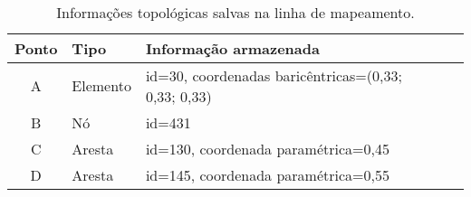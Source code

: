 
\begin{table} [hbt!]
 \begin{center}
	 \caption{Informações topológicas salvas na linha de mapeamento.\label{tab-lm-topo}}
	~\\[-2mm]
	 \begin{tabularx}
		 {\textwidth}
		 {cp{2.0cm} lp{3.0cm} lp{10.0cm}}

		 \textbf{Ponto}
		 & \textbf{Tipo}
		 & \textbf{Informação armazenada} \\ \toprule

		 A
		 & Elemento
		 & id=30, coordenadas baricêntricas=(0,33; 0,33; 0,33) \\ \midrule

		 B
		 & Nó   
		 & id=431 \\ \midrule

		 C
		 & Aresta
		 & id=130, coordenada paramétrica=0,45 \\ \midrule

		 D
		 & Aresta
		 & id=145, coordenada paramétrica=0,55 \\ \midrule

	 \end{tabularx}
 \end{center}
\end{table}
